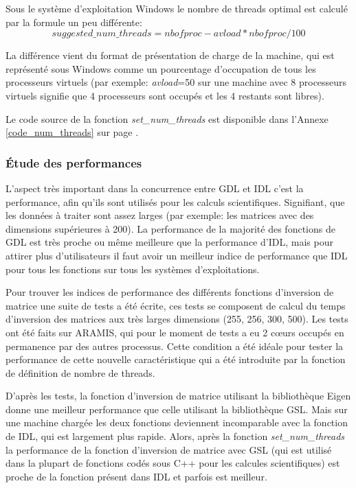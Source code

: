 Sous le système d'exploitation Windows le nombre de threads optimal est calculé par la formule un peu différente:
\begin{equation}
	suggested\_num\_threads = nbofproc - avload * nbofproc/100
  	\label{form:num_threads_w}
\end{equation}

La différence vient du format de présentation de charge de la machine, qui est représenté sous Windows comme un pourcentage d'occupation de tous les processeurs virtuels (par exemple: \textit{avload}=50 sur une machine avec 8 processeurs virtuels signifie que 4 processeurs sont occupés et les 4 restants sont libres).

Le code source de la fonction \textit{set\_num\_threads} est disponible dans l'Annexe \ref{code_num_threads} sur page \pageref{code_num_threads}.


\subsubsection{Étude des performances}

L’aspect très important dans la concurrence entre GDL et IDL c'est la performance, afin qu'ils sont utilisés pour les calculs scientifiques. Signifiant, que les données à traiter sont assez larges (par exemple: les matrices avec des dimensions supérieures à 200). La performance de la majorité des fonctions de GDL est très proche ou même meilleure que la performance d'IDL, mais pour attirer plus d'utilisateurs il faut avoir un meilleur indice de performance que IDL pour tous les fonctions sur tous les systèmes d'exploitations.

Pour trouver les indices de performance des différents fonctions d'inversion de matrice une suite de tests a été écrite, ces tests se composent de calcul du temps d'inversion des matrices aux très larges dimensions (255, 256, 300, 500). Les tests ont été faits sur \textsc{ARAMIS}, qui pour le moment de tests a eu 2 cœurs occupés en permanence par des autres processus. Cette condition a été idéale pour tester la performance de cette nouvelle caractéristique qui a été introduite par la fonction de définition de nombre de threads.

D’après les tests, la fonction d'inversion de matrice utilisant la bibliothèque Eigen donne une meilleur performance que celle utilisant la bibliothèque GSL. Mais sur une machine chargée les deux fonctions deviennent incomparable avec la fonction de IDL, qui est largement plus rapide. Alors, après la fonction \textit{set\_num\_threads} la performance de la fonction d'inversion de matrice avec GSL (qui est utilisé dans la plupart de fonctions codés sous C++ pour les calcules scientifiques) est proche de la fonction présent dans IDL et parfois est meilleur.

